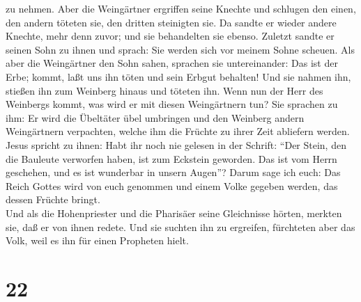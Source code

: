 zu nehmen.  Aber die Weingärtner ergriffen seine Knechte
und schlugen den einen, den andern töteten sie, den dritten steinigten
sie.  Da sandte er wieder andere Knechte, mehr denn
zuvor; und sie behandelten sie ebenso.  Zuletzt sandte er
seinen Sohn zu ihnen und sprach: Sie werden sich vor meinem Sohne
scheuen.  Als aber die Weingärtner den Sohn sahen,
sprachen sie untereinander: Das ist der Erbe; kommt, laßt uns ihn töten
und sein Erbgut behalten!  Und sie nahmen ihn, stießen
ihn zum Weinberg hinaus und töteten ihn.  Wenn nun der
Herr des Weinbergs kommt, was wird er mit diesen Weingärtnern tun?
 Sie sprachen zu ihm: Er wird die Übeltäter übel
umbringen und den Weinberg andern Weingärtnern verpachten, welche ihm
die Früchte zu ihrer Zeit abliefern werden.  Jesus
spricht zu ihnen: Habt ihr noch nie gelesen in der Schrift: ``Der Stein,
den die Bauleute verworfen haben, ist zum Eckstein geworden. Das ist vom
Herrn geschehen, und es ist wunderbar in unsern Augen''? 
Darum sage ich euch: Das Reich Gottes wird von euch genommen und einem
Volke gegeben werden, das dessen Früchte bringt.\\
 Und als die Hohenpriester und die Pharisäer seine
Gleichnisse hörten, merkten sie, daß er von ihnen redete.
 Und sie suchten ihn zu ergreifen, fürchteten aber das
Volk, weil es ihn für einen Propheten hielt.

\hypertarget{section-21}{%
\section{22}\label{section-21}}

